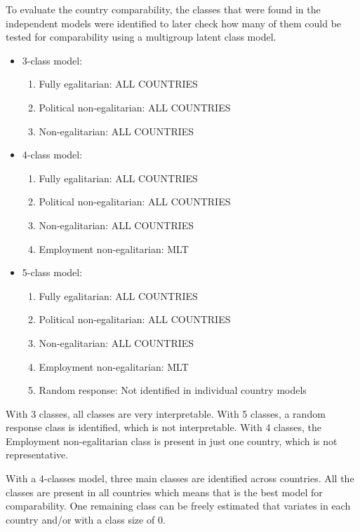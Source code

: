 \documentclass[12pt,a4paper,oneside]{reedthesis}
\providecommand{\tightlist}{%
  \setlength{\itemsep}{0pt}\setlength{\parskip}{0pt}}
\begin{document}
To evaluate the country comparability, the classes that were found in the independent models were identified to later check how many of them could be tested for comparability using a multigroup latent class model.
\begin{itemize}
\tightlist
\item
  3-class model:
  \begin{enumerate}
  \def\labelenumi{\arabic{enumi}.}
  \tightlist
  \item
    Fully egalitarian: ALL COUNTRIES
  \item
    Political non-egalitarian: ALL COUNTRIES
  \item
    Non-egalitarian: ALL COUNTRIES
  \end{enumerate}
\item
  4-class model:
  \begin{enumerate}
  \def\labelenumi{\arabic{enumi}.}
  \tightlist
  \item
    Fully egalitarian: ALL COUNTRIES
  \item
    Political non-egalitarian: ALL COUNTRIES
  \item
    Non-egalitarian: ALL COUNTRIES
  \item
    Employment non-egalitarian: MLT
  \end{enumerate}
\item
  5-class model:
  \begin{enumerate}
  \def\labelenumi{\arabic{enumi}.}
  \tightlist
  \item
    Fully egalitarian: ALL COUNTRIES
  \item
    Political non-egalitarian: ALL COUNTRIES
  \item
    Non-egalitarian: ALL COUNTRIES
  \item
    Employment non-egalitarian: MLT
  \item
    Random response: Not identified in individual country models
  \end{enumerate}
\end{itemize}
With 3 classes, all classes are very interpretable. With 5 classes, a random response class is identified, which is not interpretable. With 4 classes, the Employment non-egalitarian class is present in just one country, which is not representative.

With a 4-classes model, three main classes are identified across countries. All the classes are present in all countries which means that is the best model for comparability. One remaining class can be freely estimated that variates in each country and/or with a class size of 0.
\end{document}
